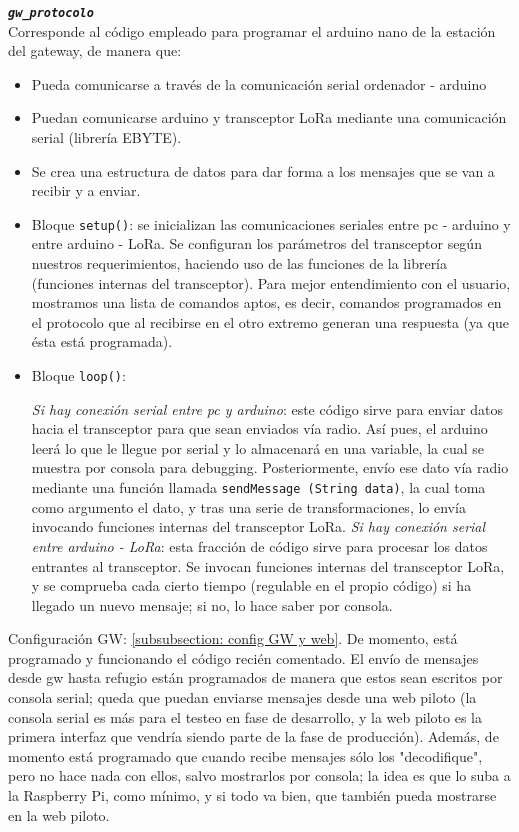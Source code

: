 \documentclass[12pt]{article}
\begin{document}
	\noindent \textbf{\texttt{\textit{gw\_protocolo}}} \\
	
	\noindent Corresponde al código empleado para programar el arduino nano de la estación del gateway, de manera que: \\
	
	\begin{itemize}
		\item Pueda comunicarse a través de la comunicación serial ordenador - arduino
		\item Puedan comunicarse arduino y transceptor LoRa mediante una comunicación serial (librería EBYTE). 
		\item Se crea una estructura de datos para dar forma a los mensajes que se van a recibir y a enviar.
		\item Bloque \texttt{setup()}: se inicializan las comunicaciones seriales entre pc - arduino y entre arduino - LoRa. Se configuran los parámetros del transceptor según nuestros requerimientos, haciendo uso de las funciones de la librería (funciones internas del transceptor). Para mejor entendimiento con el usuario, mostramos una lista de comandos aptos, es decir, comandos programados en el protocolo que al recibirse en el otro extremo generan una respuesta (ya que ésta está programada).

		\item Bloque \texttt{loop()}:
			\begin{outline}
			\1 \textit{Si hay conexión serial entre pc y arduino}: este código sirve para enviar datos hacia el transceptor para que sean enviados vía radio. Así pues, el arduino leerá lo que le llegue por serial  y lo almacenará en una variable, la cual se muestra por consola para debugging. Posteriormente, envío ese dato vía radio mediante una función llamada \texttt{sendMessage (String data)}, la cual toma como argumento el dato, y tras una serie de transformaciones, lo envía invocando funciones internas del transceptor LoRa.
			\1 \textit{Si hay conexión serial entre arduino - LoRa}: esta fracción de código sirve para procesar los datos entrantes al transceptor. Se invocan funciones internas del transceptor LoRa, y se comprueba cada cierto tiempo (regulable en el propio código) si ha llegado un nuevo mensaje; si no, lo hace saber por consola.
			\end{outline}
	\end{itemize}
	
	\noindent Configuración GW: \ref{subsubsection: config GW y web}. De momento, está programado y funcionando el código recién comentado. El envío de mensajes desde gw hasta refugio están programados de manera que estos sean escritos por consola serial; queda que puedan enviarse mensajes desde una web piloto (la consola serial es más para el testeo en fase de desarrollo, y la web piloto es la primera interfaz que vendría siendo parte de la fase de producción). Además, de momento está programado que cuando recibe mensajes sólo los "decodifique", pero no hace nada con ellos, salvo mostrarlos por consola; la idea es que lo suba a la Raspberry Pi, como mínimo, y si todo va bien, que también pueda mostrarse en la web piloto.\\
	
\end{document}
